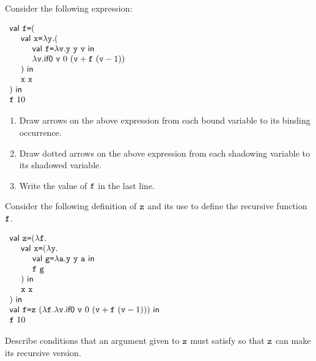 \begin{exercise}

Consider the following expression:

$\begin{array}{l}
  \ebind{\cf}{(\\
  \ \ \ \ \ebind{\cx}{\efun{\cy}{(\\
  \ \ \ \ \ \ \ \ \ebind{\cf}{\efun{\cv}{\eapp{\eapp{\cy}{\cy}}{\cv}}}{\\
  \ \ \ \ \ \ \ \ \efun{\cv}{\sumbodyfv}}\\
  \ \ \ \ )}}{\\
  \ \ \ \ \eapp{\cx}{\cx}\\
  )}}{\\
  \eapp{\cf}{10}
  }
\end{array}$

\begin{enumerate}
\item Draw arrows on the above expression from each bound variable to its binding occurrence.
\item Draw dotted arrows on the above expression from each shadowing variable to its shadowed variable.
\item Write the value of $\texttt{f}$ in the last line.
\end{enumerate}

\end{exercise}

\begin{exercise}

Consider the following definition of $\texttt{z}$ and its use to define the recursive
function $\texttt{f}$.

$\begin{array}{l}
  \ebind{\cz}{(\efun{\cf}{\\
  \ \ \ \ \ebind{\cx}{(\efun{\cy}{\\
  \ \ \ \ \ \ \ \ \ebind{\code{g}}{\efun{\code{a}}{\eapp{\eapp{\cy}{\cy}}{\code{a}}}}{\\
  \ \ \ \ \ \ \ \ \eapp{\cf}{\code{g}}}}\\
  \ \ \ \ )}{\\
  \ \ \ \ \eapp{\cx}{\cx}}}\\
  )}{\\
  \ebind{\cf}{\eapp{\cz}{(\efun{\cf}{\efun{\cv}{\sumbodyfv}})}}{\\
  \eapp{\cf}{10}
  }
}
\end{array}$

Describe conditions that an argument given to $\texttt{z}$ must satisfy so that $\texttt{z}$
    can make its recursive version.

\end{exercise}

